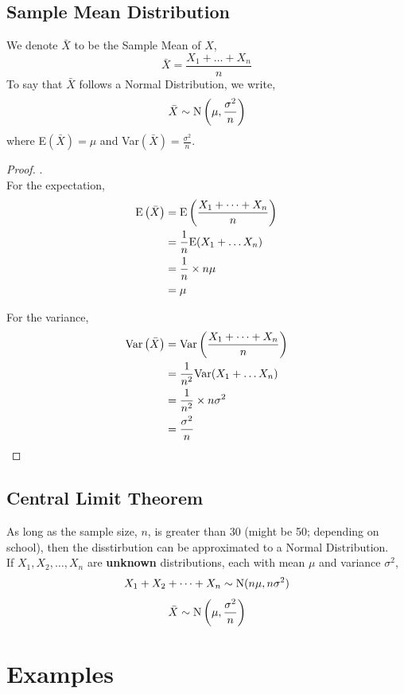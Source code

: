 \documentclass[../setup.tex]{subfiles}
\begin{document}
\subsection{Sample Mean Distribution}
\begin{theorem}
We denote $\bar{X}$ to be the Sample Mean of $X$,
\[ \bar{X} = \frac{X_1 + \dots + X_n}{n} \]
To say that $\bar{X}$ follows a Normal Distribution, we write,
\[ \bar{X} \sim \textup{N}\left(\mu, \frac{\sigma^2}{n}\right) \]
where E$\left(\bar{X}\right)=\mu$ and Var$\left(\bar{X}\right)=\frac{\sigma^2}{n}$. 
\end{theorem}
\begin{proof} . \\
For the expectation,
\begin{align*}
\textup{E}\left(\bar{X}\right) &= \textup{E}\left(\frac{X_1 + \dots + X_n}{n}\right) \\
&= \frac{1}{n}\textup{E}(X_1 + \dots X_n) \\
&= \frac{1}{n} \times n\mu \\
&= \mu
\end{align*}

For the variance,
\begin{align*}
\textup{Var}\left(\bar{X}\right) &= \textup{Var}\left(\frac{X_1 + \dots + X_n}{n}\right) \\
&= \frac{1}{n^2}\textup{Var}(X_1 + \dots X_n) \\
&= \frac{1}{n^2} \times n\sigma^2 \\
&= \frac{\sigma^2}{n}
\end{align*}
\end{proof}

\subsection{Central Limit Theorem}
\begin{theorem}
As long as the sample size, $n$, is greater than $30$ (might be 50; depending on school), then the disstirbution can be approximated to a Normal Distribution. \\
If $X_1, X_2, \dots, X_n$ are \textbf{unknown} distributions, each with mean $\mu$ and variance $\sigma^2$,
\[ X_1 + X_2 + \dots + X_n \sim \textup{N}(n\mu, n\sigma^2) \]
\[ \bar{X} \sim \textup{N}\left(\mu, \frac{\sigma^2}{n}\right) \]
\end{theorem}
\clearpage

\section{Examples}
\end{document}
